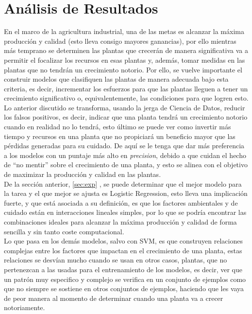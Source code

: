 \documentclass[12pt,a4paper]{article}
\begin{document}
    \section{Análisis de Resultados}\label{sec:analisis}
    {
        En el marco de la agricultura industrial, una de las metas es alcanzar 
        la máxima producción y calidad (esto lleva consigo mayores ganancias), 
        por ello mientras más temprano se determinen las plantas que crecerán 
        de manera significativa va a permitir el focalizar los recursos en esas 
        plantas y, además, tomar medidas en las plantas que no tendrán un 
        crecimiento notorio. Por ello, se vuelve importante el construir modelos 
        que clasifiquen las plantas de manera adecuada bajo esta criteria, es decir, 
        incrementar los esfuerzos para que las plantas lleguen a tener un crecimiento 
        significativo o, equivalentemente, las condiciones para que logren esto.\\

        Lo anterior discutido se transforma, usando la jerga de Ciencia de Datos, reducir 
        los falsos positivos, es decir, indicar que una planta tendrá un crecimiento 
        notorio cuando en realidad no lo tendrá, esto último se puede ver como invertir 
        más tiempo y recursos en una planta que no propiciará un beneficio mayor que 
        las pérdidas generadas para su cuidado. De aquí se le tenga que dar más preferencia 
        a los modelos con un puntaje más alto en \emph{precision}, debido a que cuidan 
        el hecho de ``no mentir'' sobre el crecimiento de una planta, y esto se alinea con 
        el objetivo de maximizar la producción y calidad en las plantas.\\ 

        De la sección anterior, \ref{sec:exp} , se puede determinar 
        que el mejor modelo para la tarea y el que mejor se ajusta es Logistic Regression, 
        esto lleva una implicación fuerte, y que está asociada a su definición, es que 
        los factores ambientales y de cuidado están en interacciones lineales simples, 
        por lo que se podría encontrar las combinaciones ideales para alcanzar la máxima 
        producción y calidad de forma sencilla y sin tanto coste computacional.\\

        Lo que pasa en los demás modelos, salvo con SVM, es que construyen relaciones 
        complejas entre los factores que impactan en el crecimiento de una planta, estas 
        relaciones se desvían mucho cuando se usan en otros casos, plantas, que no 
        pertenezcan a las usadas para el entrenamiento de los modelos, es decir, ver que 
        un patrón muy especifico y complejo se verifica en un conjunto de ejemplos como 
        que no siempre se sostiene en otros conjuntos de ejemplos, haciendo que les vaya 
        de peor manera al momento de determinar cuando una planta va a crecer notoriamente.\\

}
\end{document}

